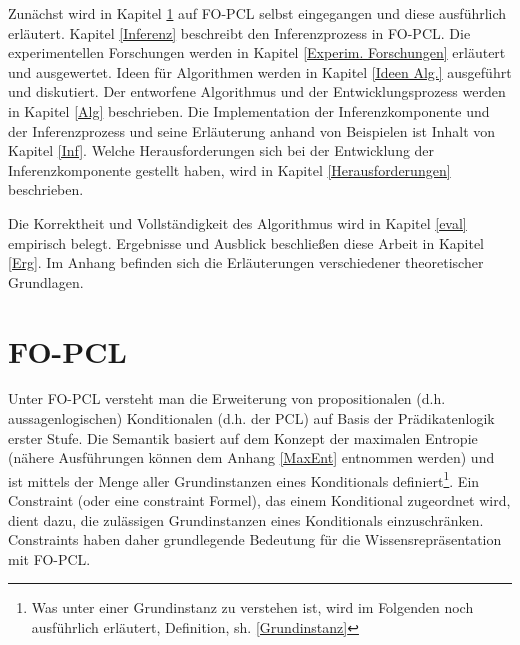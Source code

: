 \documentclass[draft]{scrreprt}
\begin{document}
Zunächst wird in Kapitel \ref{FO-PCL} auf FO-PCL selbst eingegangen und diese ausführlich erläutert. Kapitel \ref{Inferenz} beschreibt den Inferenzprozess in FO-PCL. Die experimentellen Forschungen werden in Kapitel \ref{Experim. Forschungen} erläutert und ausgewertet. Ideen für Algorithmen werden in Kapitel \ref{Ideen Alg.} ausgeführt und diskutiert. Der entworfene Algorithmus und der Entwicklungsprozess werden in Kapitel \ref{Alg}  beschrieben. Die Implementation der Inferenzkomponente und der Inferenzprozess  und seine Erläuterung anhand von Beispielen ist Inhalt von Kapitel \ref{Inf}. 
Welche Herausforderungen sich bei der Entwicklung der Inferenzkomponente gestellt haben, wird in Kapitel \ref{Herausforderungen} beschrieben.

 Die Korrektheit und Vollständigkeit des Algorithmus wird in Kapitel \ref{eval} empirisch belegt. Ergebnisse und Ausblick beschließen diese Arbeit in Kapitel \ref{Erg}. Im Anhang befinden sich die Erläuterungen verschiedener theoretischer Grundlagen.



\newpage

\chapter{FO-PCL}\label{FO-PCL} 
Unter FO-PCL versteht man die Erweiterung von propositionalen (d.h. aussagenlogischen) Konditionalen (d.h. der PCL) auf Basis der Prädikatenlogik erster Stufe. Die Semantik basiert auf dem Konzept der maximalen Entropie (nähere Ausführungen können dem Anhang \ref{MaxEnt} entnommen werden) und ist mittels der Menge aller Grundinstanzen eines Konditionals definiert\footnote{Was unter einer Grundinstanz zu verstehen ist, wird im Folgenden noch ausführlich erläutert, Definition, sh. \ref{Grundinstanz} }. Ein Constraint  (oder eine constraint Formel), das einem Konditional  zugeordnet wird, dient dazu,  die zulässigen Grundinstanzen eines Konditionals einzuschränken. Constraints haben daher grundlegende Bedeutung für die Wissensrepräsentation mit FO-PCL.
\end{document}
